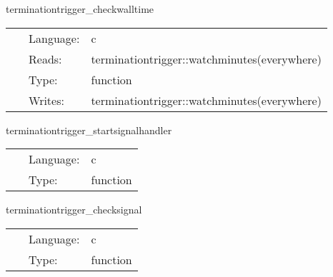 \vspace{5mm}


\hspace{5mm} terminationtrigger\_checkwalltime 

\hspace{5mm}{\it check elapsed job walltime } 


\hspace{5mm}

 \begin{tabular*}{160mm}{cll} 
~ & Language:  & c \\ 
~ & Reads:  & terminationtrigger::watchminutes(everywhere) \\ 
~ & Type:  & function \\ 
~ & Writes:  & terminationtrigger::watchminutes(everywhere) \\ 
\end{tabular*} 


\vspace{5mm}


\hspace{5mm} terminationtrigger\_startsignalhandler 

\hspace{5mm}{\it start signal handler } 


\hspace{5mm}

 \begin{tabular*}{160mm}{cll} 
~ & Language:  & c \\ 
~ & Type:  & function \\ 
\end{tabular*} 


\vspace{5mm}


\hspace{5mm} terminationtrigger\_checksignal 

\hspace{5mm}{\it check if we received a termination signal } 


\hspace{5mm}

 \begin{tabular*}{160mm}{cll} 
~ & Language:  & c \\ 
~ & Type:  & function \\ 
\end{tabular*} 


